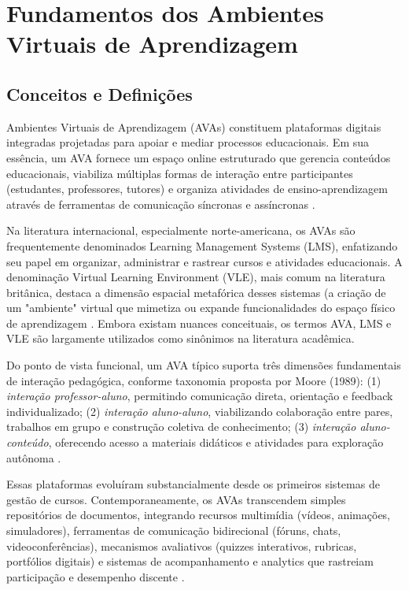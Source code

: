 \documentclass[portuguese]{sbc2025}%
\begin{document}
\section{Fundamentos dos Ambientes Virtuais de Aprendizagem}
\label{sec:fundamentos}

\subsection{Conceitos e Definições}

Ambientes Virtuais de Aprendizagem (AVAs) constituem plataformas digitais integradas projetadas para apoiar e mediar processos educacionais. Em sua essência, um AVA fornece um espaço online estruturado que gerencia conteúdos educacionais, viabiliza múltiplas formas de interação entre participantes (estudantes, professores, tutores) e organiza atividades de ensino-aprendizagem através de ferramentas de comunicação síncronas e assíncronas \cite{Pereira2007, Campbell2025}.

Na literatura internacional, especialmente norte-americana, os AVAs são frequentemente denominados Learning Management Systems (LMS), enfatizando seu papel em organizar, administrar e rastrear cursos e atividades educacionais. A denominação Virtual Learning Environment (VLE), mais comum na literatura britânica, destaca a dimensão espacial metafórica desses sistemas (a criação de um "ambiente" virtual que mimetiza ou expande funcionalidades do espaço físico de aprendizagem \cite{Campbell2025}. Embora existam nuances conceituais, os termos AVA, LMS e VLE são largamente utilizados como sinônimos na literatura acadêmica.

Do ponto de vista funcional, um AVA típico suporta três dimensões fundamentais de interação pedagógica, conforme taxonomia proposta por Moore (1989): (1) \textit{interação professor-aluno}, permitindo comunicação direta, orientação e feedback individualizado; (2) \textit{interação aluno-aluno}, viabilizando colaboração entre pares, trabalhos em grupo e construção coletiva de conhecimento; (3) \textit{interação aluno-conteúdo}, oferecendo acesso a materiais didáticos e atividades para exploração autônoma \cite{Moore1989}.

Essas plataformas evoluíram substancialmente desde os primeiros sistemas de gestão de cursos. Contemporaneamente, os AVAs transcendem simples repositórios de documentos, integrando recursos multimídia (vídeos, animações, simuladores), ferramentas de comunicação bidirecional (fóruns, chats, videoconferências), mecanismos avaliativos (quizzes interativos, rubricas, portfólios digitais) e sistemas de acompanhamento e analytics que rastreiam participação e desempenho discente \cite{Bates2015, Garrison2016}.
\end{document}
